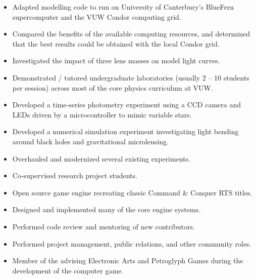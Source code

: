 \documentclass[print]{cv-style}
\begin{document}
\begin{entrylist}
  {
\begin{itemize}
    \item Adapted modelling code to run on University of Canterbury’s BlueFern supercomputer and the VUW Condor computing grid.
    \item Compared the benefits of the available computing resources, and determined that the best results could be obtained with the local Condor grid.
    \item Investigated the impact of three lens masses on model light curves.
  \end{itemize}}
  {
  \begin{itemize}
    \item Demonstrated / tutored undergraduate laboratories (usually 2 -- 10 students per session) across most of the core physics curriculum at VUW.
    \item Developed a time-series photometry experiment using a CCD camera and LEDs driven by a microcontroller to mimic variable stars.
    \item Developed a numerical simulation experiment investigating light bending around black holes and gravitational microlensing.
    \item Overhauled and modernized several existing experiments.
    \item Co-supervised research project students.
    \end{itemize}}
  {
\begin{itemize}
    \item Open source game engine recreating classic Command \& Conquer RTS titles.
    \item Designed and implemented many of the core engine systems.
    \item Performed code review and mentoring of new contributors.
	\item Performed project management, public relations, and other community roles.
	\item Member of the  advising Electronic Arts and Petroglyph Games during the development of the  computer game.
  \end{itemize}}

\end{entrylist}
\end{document}
